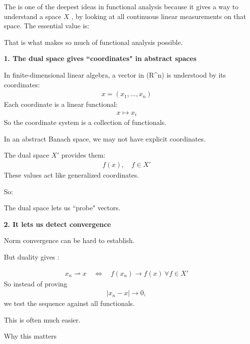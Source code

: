 The  is one of the deepest ideas in functional analysis because it gives a way to understand a space $X$ , by looking at all continuous linear measurements on that space.  The essential value is: \> 

That is what makes so much of functional analysis possible.

\begin{description}

\item \textbf{1. The dual space gives ``coordinates" in abstract spaces}

In finite-dimensional linear algebra, a vector in (\mathbb R^n) is understood by its coordinates:
\begin{align*}
x=(x_1,\dots,x_n)
\end{align*}
Each coordinate is a linear functional:
\begin{align*}
x\mapsto x_i
\end{align*}
So the coordinate system is a collection of functionals.

In an abstract Banach space, we may not have explicit coordinates.

The dual space $X'$ provides them:
\begin{align*}
f(x),\quad f\in X'
\end{align*}
These values act like generalized coordinates.

So:

\> The dual space lets us ``probe" vectors.

\item \textbf{2. It lets us detect convergence}

Norm convergence can be hard to establish.

But duality gives :

\begin{align*}
x_n\rightharpoonup x
\quad\Longleftrightarrow\quad
f(x_n)\to f(x)\ \forall f\in X'
\end{align*}
So instead of proving
\begin{align*}
|x_n-x|\to 0,
\end{align*}
we test the sequence against all functionals.

This is often much easier.

    \item Why this matters


\end{description}
